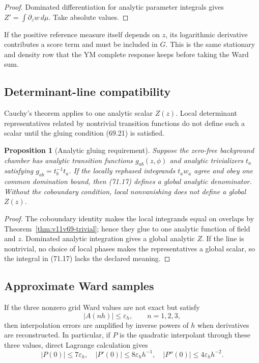 \documentclass[11pt]{article}
\newtheorem{proposition}[theorem]{Proposition}
\begin{document}
\begin{proof}
Dominated differentiation for analytic parameter integrals gives
\(Z'=\int\partial_zw\,d\mu\).  Take absolute values.
\end{proof}

If the positive reference measure itself depends on \(z\), its
logarithmic derivative contributes a score term and must be included in
\(G\).  This is the same stationary and density row that the YM
complete response keeps before taking the Ward sum.

\subsection{Determinant-line compatibility}

Cauchy's theorem applies to one analytic scalar \(Z(z)\).  Local
determinant representatives related by nontrivial transition functions
do not define such a scalar until the gluing condition (69.21) is
satisfied.

\begin{proposition}[Analytic gluing requirement]
\label{prop:v11v71-gluing}
Suppose the zero-free background chamber has analytic transition
functions \(g_{ab}(z,\phi)\) and analytic trivializers \(t_a\)
satisfying \(g_{ab}=t_b^{-1}t_a\).  If the locally rephased integrands
\(t_aw_a\) agree and obey one common domination bound, then (71.17)
defines a global analytic denominator.  Without the coboundary
condition, local nonvanishing does not define a global \(Z(z)\).
\end{proposition}

\begin{proof}
The coboundary identity makes the local integrands equal on overlaps
by Theorem~\ref{thm:v11v69-trivial}; hence they glue to one analytic
function of field and \(z\).  Dominated analytic integration gives a
global analytic \(Z\).  If the line is nontrivial, no choice of local
phases makes the representatives a global scalar, so the integral in
(71.17) lacks the declared meaning.
\end{proof}

\subsection{Approximate Ward samples}

If the three nonzero grid Ward values are not exact but satisfy
\[
                              |A(nh)|\le\varepsilon_h,
                              \qquad n=1,2,3,                 \tag{71.20}
\]
then interpolation errors are amplified by inverse powers of \(h\)
when derivatives are reconstructed.  In particular, if \(P\) is the
quadratic interpolant through these three values, direct Lagrange
calculation gives
\[
 |P(0)|\le7\varepsilon_h,\quad
 |P'(0)|\le8\varepsilon_hh^{-1},\quad
 |P''(0)|\le4\varepsilon_hh^{-2}.                             \tag{71.21}
\]
\end{document}
